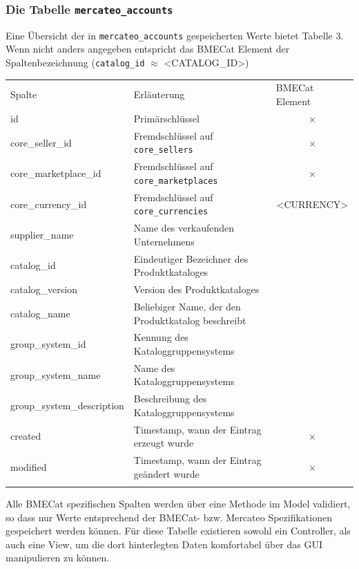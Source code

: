 	\subsubsection{Die Tabelle \texttt{mercateo\_accounts}}
	
	Eine Übersicht der in \texttt{mercateo\_accounts} gespeicherten Werte bietet Tabelle 3. Wenn nicht anders angegeben entspricht das BMECat Element der Spaltenbezeichnung (\texttt{catalog\_id} $\approx$ \textless CATALOG\_ID\textgreater )

	\begin{table}[!htbp]
		\begin{tabularx}{\textwidth \small}{p{4cm} X p{2.8cm} }
			\rowcolor[HTML]{EFEFEF} 
			Spalte & Erläuterung & BMECat Element \\ \cline{1-3} \addlinespace[7pt]
			id & Primärschlüssel & \multicolumn{1}{c}{\normalsize$\times$} \\
			core\_seller\_id & Fremdschlüssel auf \texttt{core\_sellers}  & \multicolumn{1}{c}{\normalsize$\times$}  \\ 
			core\_marketplace\_id & Fremdschlüssel auf \texttt{core\_marketplaces} & \multicolumn{1}{c}{\normalsize$\times$} \\ 
			core\_currency\_id & Fremdschlüssel auf \texttt{core\_currencies}  &\multicolumn{1}{c}{ \textless CURRENCY\textgreater} \\ 
			supplier\_name & Name des verkaufenden Unternehmens & \multicolumn{1}{c}{\normalsize \checked}   \\
			catalog\_id & Eindeutiger Bezeichner des Produktkataloges & \multicolumn{1}{c}{\normalsize \checked}  \\
			catalog\_version & Version des Produktkataloges & \multicolumn{1}{c}{\normalsize \checked} \\
			catalog\_name & Beliebiger Name, der den Produktkatalog beschreibt & \multicolumn{1}{c}{\normalsize \checked} \\
			group\_system\_id & Kennung des Kataloggruppensystems & \multicolumn{1}{c}{\normalsize \checked}  \\
			group\_system\_name & Name des Kataloggruppensystems & \multicolumn{1}{c}{\normalsize \checked}  \\
			group\_system\_description & Beschreibung des Kataloggruppensystems & \multicolumn{1}{c}{\normalsize \checked} \\	
			created & Timestamp, wann der Eintrag erzeugt wurde & \multicolumn{1}{c}{\normalsize$\times$} \\
			modified & Timestamp, wann der Eintrag geändert wurde & \multicolumn{1}{c}{\normalsize$\times$}\\\addlinespace[7pt] \cline{1-3} 
		\end{tabularx}%
	\end{table}
	Alle BMECat spezifischen Spalten werden über eine Methode im Model validiert, so dass nur Werte entsprechend der BMECat- bzw. Mercateo Spezifikationen gespeichert werden können. Für diese Tabelle existieren sowohl ein Controller, als auch eine View, um die dort hinterlegten Daten komfortabel über das GUI manipulieren zu können.
	 

